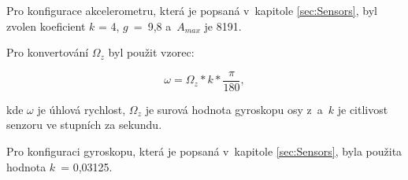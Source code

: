 Pro konfigurace akcelerometru, která je popsaná v~kapitole \ref{sec:Sensors}, 
byl zvolen koeficient $k$ = 4, $g$~=~9,8 a~$A_{max}$ je 8191.

Pro konvertování $\Omega_z$ byl použit vzorec:

\begin{equation}
\omega = \Omega_z * k * \frac{\pi}{180},
\end{equation}

kde $\omega$ je úhlová rychlost, $\Omega_z$ je surová hodnota gyroskopu osy
z~a~$k$ je citlivost senzoru ve stupních za sekundu. 

Pro konfiguraci gyroskopu, která je popsaná v~kapitole \ref{sec:Sensors}, 
byla použita hodnota $k$~= 0,03125.

\endinput
